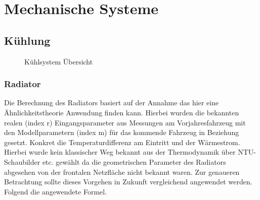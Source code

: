
\chapter{Mechanische Systeme}

%
%
%


\section{Kühlung}

\begin{figure}[H]
	\centering
	
	\caption{Kühlsystem Übersicht}
	\label{abb:Coolingssystem}
\end{figure}

\FloatBarrier
\subsection{Radiator}
Die Berechnung des Radiators basiert auf der Annahme das hier eine Ähnlichkeitstheorie Anwendung finden kann. Hierbei wurden die bekannten realen (index r) Eingangsparameter aus Messungen am Vorjahresfahrzeug mit den Modellparametern (index m) für das kommende Fahrzeug in Beziehung gesetzt. Konkret die Temperaturdifferenz am Eintritt und der Wärmestrom. Hierbei wurde kein klassischer Weg bekannt aus der Thermodynamik über \ac{NTU}-Schaubilder etc. gewählt da die geometrischen Parameter des Radiators abgesehen von der frontalen Netzfläche nicht bekannt waren. Zur genaueren Betrachtung sollte dieses Vorgehen in Zukunft vergleichend angewendet werden. Folgend die angewendete Formel.

